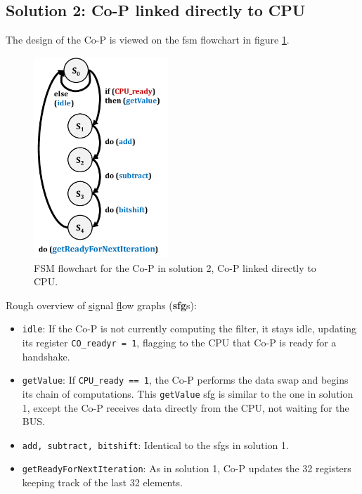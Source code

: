\newpage
\subsection{Solution 2: Co-P linked directly to CPU}

The design of the Co-P is viewed on the fsm flowchart in figure \ref{fig:fsm2}. 

\begin{figure}[H]
    \centering
    \includegraphics[width=0.45\textwidth]{2Implementation/fig/fsm2.pdf}
    \caption{FSM flowchart for the Co-P in solution 2, Co-P linked directly to CPU.}
    \label{fig:fsm2}
\end{figure}

Rough overview of \underline{s}ignal \underline{f}low \underline{g}raphs (\textbf{sfg}s): 
\begin{itemize}
\item \texttt{idle}: If the Co-P is not currently computing the filter, it stays idle, updating its register \texttt{CO\_readyr = 1}, flagging to the CPU that Co-P is ready for a handshake.

\item \texttt{getValue}: If \texttt{CPU\_ready == 1}, the Co-P performs the data swap and begins its chain of computations. This \texttt{getValue} sfg is similar to the one in solution 1, except the Co-P receives data directly from the CPU, not waiting for the BUS. 

\item \texttt{add, subtract, bitshift}: Identical to the sfgs in solution 1.

\item \texttt{getReadyForNextIteration}: As in solution 1, Co-P updates the 32 registers keeping track of the last 32 elements. 
\end{itemize}

